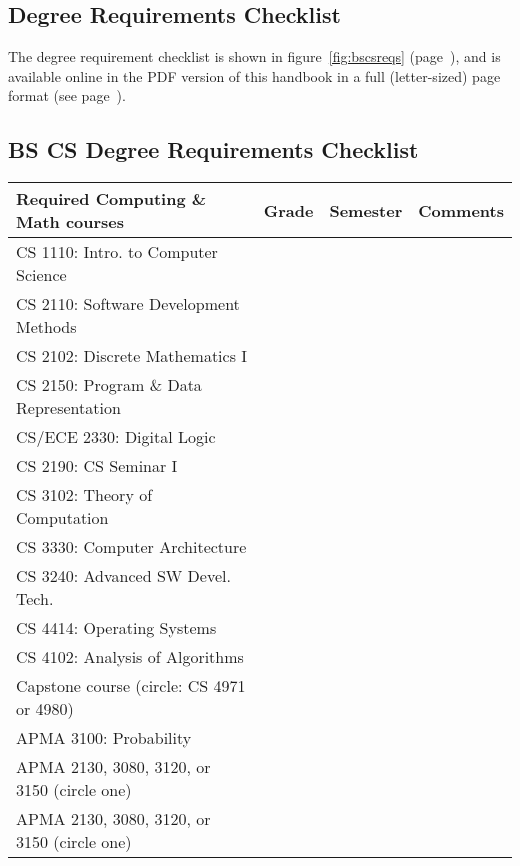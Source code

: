 \subsection{Degree Requirements Checklist}

The degree requirement checklist is shown in figure~\ref{fig:bscsreqs}
(page~\pageref{fig:bscsreqs}), and is available 
online in the PDF version of this handbook in a full
(letter-sized) page format (see page~\pageref{fig:bscsreqs}).

\begin{figure*}
\subsection*{BS CS Degree Requirements Checklist}
\label{fig:bscsreqs}
\begin{center}
\begin{tabular}{|l|l|l|p{1.2in}|} \hline
\bf Required Computing \& Math courses & \bf Grade & \bf Semester &
\bf Comments \\ \hline \hline
CS 1110: Intro. to Computer Science & & & \\ \hline
CS 2110: Software Development Methods & & & \\ \hline
CS 2102: Discrete Mathematics I & & & \\ \hline
CS 2150: Program \& Data Representation & & & \\ \hline
CS/ECE 2330: Digital Logic & & & \\ \hline
CS 2190: CS Seminar I & & & \\ \hline
CS 3102: Theory of Computation & & & \\ \hline
CS 3330: Computer Architecture & & & \\ \hline
CS 3240: Advanced SW Devel. Tech. & & & \\ \hline
CS 4414: Operating Systems & & & \\ \hline
CS 4102: Analysis of Algorithms & & & \\ \hline
Capstone course (circle: CS 4971 or 4980) & & & \\ \hline
APMA 3100: Probability & & & \\ \hline
APMA 2130, 3080, 3120, or 3150 (circle one) & & & \\ \hline
APMA 2130, 3080, 3120, or 3150 (circle one) & & & \\ \hline
\end{tabular}


\end{center}
\end{figure*}
